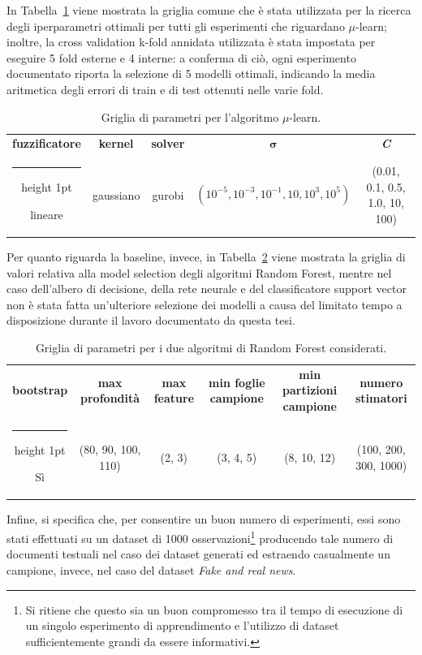 \documentclass[12pt]{report}
\makeatletter
\theoremstyle{definition}
\newcommand{\thickhline}{%
    \noalign {\ifnum 0=`}\fi \hrule height 1pt
    \futurelet \reserved@a \@xhline
}
\makeatother
\begin{document}
In Tabella~\ref{gridtable} viene mostrata la griglia comune che è stata utilizzata per la ricerca degli iperparametri ottimali per tutti gli esperimenti che riguardano $\mu$-learn; inoltre, la cross validation k-fold annidata utilizzata è stata impostata per eseguire 5 fold esterne e 4 interne: a conferma di ciò, ogni esperimento documentato riporta la selezione di 5 modelli ottimali, indicando la media aritmetica degli errori di train e di test ottenuti nelle varie fold.
\begin{table}
\centering
\begin{adjustbox}{max width=\textwidth}
 \begin{tabular}{|c|c|c|c|c|} 
 \hline
\textbf{fuzzificatore} & \textbf{kernel} & \textbf{solver} & $\bm{\sigma}$ & \textit{\textbf{C}} 
\\ [0.5ex] 
 \thickhline
 lineare & gaussiano & gurobi & $(10^{-5}, 10^{-3}, 10^{-1}, 10, 10^3, 10^5)$ & (0.01, 0.1, 0.5, 1.0, 10, 100) \\ 
 \hline
\end{tabular}
\end{adjustbox}
\caption{Griglia di parametri per l'algoritmo $\mu$-learn.}
\label{gridtable}
\end{table}
Per quanto riguarda la baseline, invece, in Tabella~\ref{gridtablebaseline} viene mostrata la griglia di valori relativa alla model selection degli algoritmi Random Forest, mentre nel caso dell'albero di decisione, della rete neurale e del classificatore support vector non è stata fatta un'ulteriore selezione dei modelli a causa del limitato tempo a disposizione durante il lavoro documentato da questa tesi.
\begin{table}
\centering
\begin{adjustbox}{max width=\textwidth}
 \begin{tabular}{|c|c|c|c|c|c|} 
 \hline
\textbf{bootstrap} & \textbf{max profondità} & \textbf{max feature} & \textbf{min foglie campione} & \textbf{min partizioni campione} & \textbf{numero stimatori}
\\ [0.5ex] 
 \thickhline
 Sì & (80, 90, 100, 110) & (2, 3) & (3, 4, 5) & (8, 10, 12) & (100, 200, 300, 1000) \\ 
 \hline
\end{tabular}
\end{adjustbox}
\caption{Griglia di parametri per i due algoritmi di Random Forest considerati.}
\label{gridtablebaseline}
\end{table}
Infine, si specifica che, per consentire un buon numero di esperimenti, essi sono stati effettuati su un dataset di 1000 osservazioni\footnote{Si ritiene che questo sia un buon compromesso tra il tempo di esecuzione di un singolo esperimento di apprendimento e l'utilizzo di dataset sufficientemente grandi da essere informativi.} producendo tale numero di documenti testuali nel caso dei dataset generati ed estraendo casualmente un campione, invece, nel caso del dataset \textit{Fake and real news}.
\end{document}
